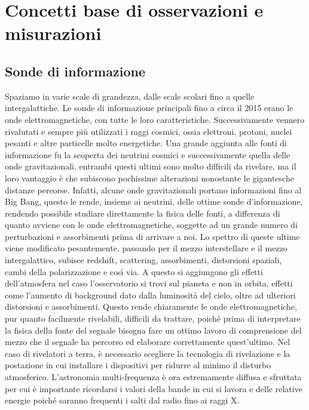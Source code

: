 \documentclass[a4paper,twoside,openany,notitlepage]{book}
\theoremstyle{definition}
\theoremstyle{plain}
\begin{document}
\chapter{Concetti base di osservazioni e misurazioni}

\section{Sonde di informazione}

Spaziamo in varie scale di grandezza, dalle scale scolari fino a quelle intergalattiche.
Le sonde di informazione principali fino a circa il 2015 erano le onde elettromagnetiche, con tutte le loro caratteristiche. Successivamente vennero rivalutati e sempre più utilizzati i raggi cosmici, ossia elettroni, protoni, nuclei pesanti e altre particelle molto energetiche. Una grande aggiunta alle fonti di informazione fu la scoperta dei neutrini cosmici e successivamente quella delle onde gravitazionali, entrambi questi ultimi sono molto difficili da rivelare, ma il loro vantaggio è che subiscono pochissime alterazioni nonostante le gigantesche distanze percorse. Infatti, alcune onde gravitazionali portano informazioni fino al Big Bang, questo le rende, insieme ai neutrini, delle ottime sonde d'informazione, rendendo possibile studiare direttamente la fisica delle fonti, a differenza di quanto avviene con le onde elettromagnetiche, soggette ad un grande numero di perturbazioni e assorbimenti prima di arrivare a noi. Lo spettro di queste ultime viene modificato pesantemente, passando per il mezzo interstellare e il mezzo intergalattico, subisce redshift, scattering, assorbimenti, distorsioni spaziali, cambi della polarizzazione e così via. A questo si aggiungono gli effetti dell'atmosfera nel caso l'osservatorio si trovi sul pianeta e non in orbita, effetti come l'aumento di background dato dalla luminosità del cielo, oltre ad ulteriori distorsioni e assorbimenti. Questo rende chiaramente le onde elettromagnetiche, pur quanto facilmente rivelabili, difficili da trattare, poiché prima di interpretare la fisica della fonte del segnale bisogna fare un ottimo lavoro di comprensione del mezzo che il segnale ha percorso ed elaborare correttamente quest'ultimo. Nel caso di rivelatori a terra, è necessario scegliere la tecnologia di rivelazione e la postazione in cui installare i dispositivi per ridurre al minimo il disturbo atmosferico. L'astronomia multi-frequenza è ora estremamente diffusa e sfruttata per cui è importante ricordarsi i valori della bande in cui si lavora e delle relative energie poiché saranno frequenti i salti dal radio fino ai raggi X.
\end{document}
